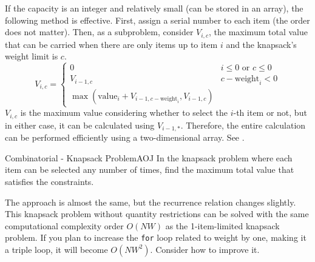 If the capacity is an integer and relatively small (can be stored in an array), the following method is effective. First, assign a serial number to each item (the order does not matter). Then, as a subproblem, consider $V_{i,c}$, the maximum total value that can be carried when there are only items up to item $i$ and the knapsack's weight limit is $c$.
\begin{equation*}
    V_{i,c} = \left\{
  \begin{array}{ll}
    0 & i \le 0 \text{ or } c \le 0\\
    V_{i-1,c} & c-\text{weight}_i < 0 \\
    \max(\text{value}_i + V_{i-1,c-\text{weight}_i}, V_{i-1,c})
  \end{array}\right.
\end{equation*}
$V_{i,c}$ is the maximum value considering whether to select the $i$-th item or not, but in either case, it can be calculated using $V_{i-1,*}$. Therefore, the entire calculation can be performed efficiently using a two-dimensional array. See \pcaojbook[pp.~416--].

\begin{center}
\end{center}

\begin{pbox}{Combinatorial - Knapsack Problem}{AOJ}
In the knapsack problem where each item can be selected any number of times, find the maximum total value that satisfies the constraints.

\end{pbox}

The approach is almost the same, but the recurrence relation changes slightly. This knapsack problem without quantity restrictions can be solved with the same computational complexity order $O(NW)$ as the 1-item-limited knapsack problem. If you plan to increase the \texttt{for} loop related to weight by one, making it a triple loop, it will become $O(NW^2)$. Consider how to improve it.

